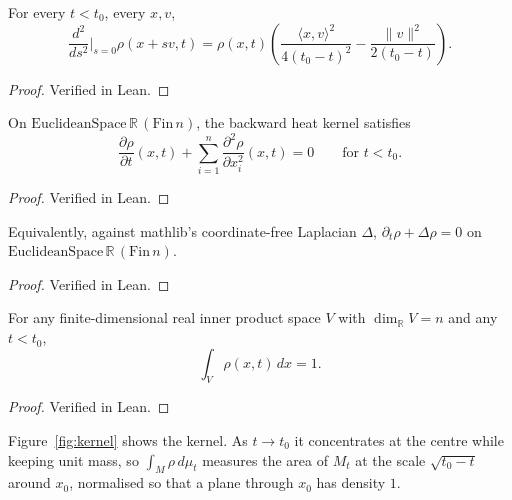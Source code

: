 \begin{lemma}
  \label{lem:rho-dxx}
  \leanok
  For every $t < t_0$, every $x, v$,
  \[
    \frac{d^2}{ds^2}\bigg|_{s=0} \rho(x + s v, t)
      = \rho(x, t)
        \left(\frac{\langle x, v\rangle^2}{4(t_0 - t)^2}
          - \frac{\|v\|^2}{2(t_0 - t)}\right).
  \]
\end{lemma}
\begin{proof}\leanok Verified in Lean. \end{proof}

\begin{theorem}
  \label{thm:rho-heat-coord}
  \leanok
  On $\mathrm{EuclideanSpace}\,\mathbb{R}\,(\mathrm{Fin}\,n)$, the backward heat
  kernel satisfies
  \[
    \frac{\partial \rho}{\partial t}(x, t)
      + \sum_{i=1}^{n} \frac{\partial^2 \rho}{\partial x_i^2}(x, t) = 0
    \qquad \text{for } t < t_0.
  \]
\end{theorem}
\begin{proof}\leanok Verified in Lean. \end{proof}

\begin{theorem}
  \label{thm:rho-heat-laplacian}
  \leanok
  Equivalently, against mathlib's coordinate-free Laplacian $\Delta$,
  $\partial_t \rho + \Delta \rho = 0$ on
  $\mathrm{EuclideanSpace}\,\mathbb{R}\,(\mathrm{Fin}\,n)$.
\end{theorem}
\begin{proof}\leanok Verified in Lean. \end{proof}

\begin{theorem}
  \label{thm:rho-integral}
  \leanok
  For any finite-dimensional real inner product space $V$ with
  $\dim_{\mathbb{R}} V = n$ and any $t < t_0$,
  \[
    \int_V \rho(x, t)\,dx = 1.
  \]
\end{theorem}
\begin{proof}\leanok Verified in Lean. \end{proof}

Figure~\ref{fig:kernel} shows the kernel. As $t \to t_0$ it concentrates at the centre while
keeping unit mass, so $\int_M \rho\,d\mu_t$ measures the area of $M_t$ at the scale
$\sqrt{t_0 - t}$ around $x_0$, normalised so that a plane through $x_0$ has density $1$.

